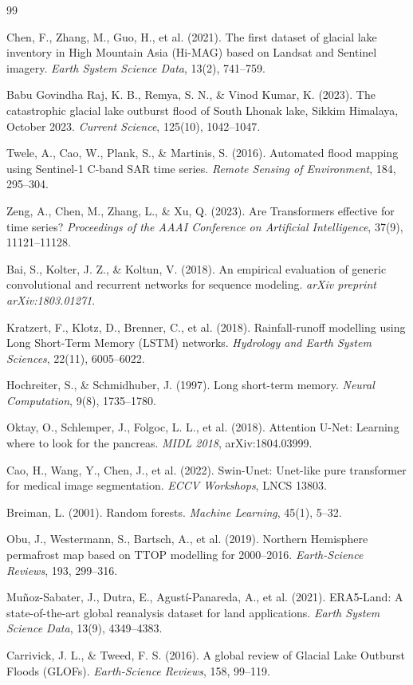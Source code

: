 \documentclass[12pt,a4paper]{report}
\begin{document}
\begin{thebibliography}{99}

Chen, F., Zhang, M., Guo, H., et al. (2021). The first dataset of glacial lake inventory in High Mountain Asia (Hi-MAG) based on Landsat and Sentinel imagery. \textit{Earth System Science Data}, 13(2), 741--759.

Babu Govindha Raj, K. B., Remya, S. N., \& Vinod Kumar, K. (2023). The catastrophic glacial lake outburst flood of South Lhonak lake, Sikkim Himalaya, October 2023. \textit{Current Science}, 125(10), 1042--1047.

Twele, A., Cao, W., Plank, S., \& Martinis, S. (2016). Automated flood mapping using Sentinel-1 C-band SAR time series. \textit{Remote Sensing of Environment}, 184, 295--304.

Zeng, A., Chen, M., Zhang, L., \& Xu, Q. (2023). Are Transformers effective for time series? \textit{Proceedings of the AAAI Conference on Artificial Intelligence}, 37(9), 11121--11128.

Bai, S., Kolter, J. Z., \& Koltun, V. (2018). An empirical evaluation of generic convolutional and recurrent networks for sequence modeling. \textit{arXiv preprint arXiv:1803.01271}.

Kratzert, F., Klotz, D., Brenner, C., et al. (2018). Rainfall-runoff modelling using Long Short-Term Memory (LSTM) networks. \textit{Hydrology and Earth System Sciences}, 22(11), 6005--6022.

Hochreiter, S., \& Schmidhuber, J. (1997). Long short-term memory. \textit{Neural Computation}, 9(8), 1735--1780.

Oktay, O., Schlemper, J., Folgoc, L. L., et al. (2018). Attention U-Net: Learning where to look for the pancreas. \textit{MIDL 2018}, arXiv:1804.03999.

Cao, H., Wang, Y., Chen, J., et al. (2022). Swin-Unet: Unet-like pure transformer for medical image segmentation. \textit{ECCV Workshops}, LNCS 13803.

Breiman, L. (2001). Random forests. \textit{Machine Learning}, 45(1), 5--32.

Obu, J., Westermann, S., Bartsch, A., et al. (2019). Northern Hemisphere permafrost map based on TTOP modelling for 2000--2016. \textit{Earth-Science Reviews}, 193, 299--316.

Muñoz-Sabater, J., Dutra, E., Agustí-Panareda, A., et al. (2021). ERA5-Land: A state-of-the-art global reanalysis dataset for land applications. \textit{Earth System Science Data}, 13(9), 4349--4383.

Carrivick, J. L., \& Tweed, F. S. (2016). A global review of Glacial Lake Outburst Floods (GLOFs). \textit{Earth-Science Reviews}, 158, 99--119.

\end{thebibliography}
\end{document}

